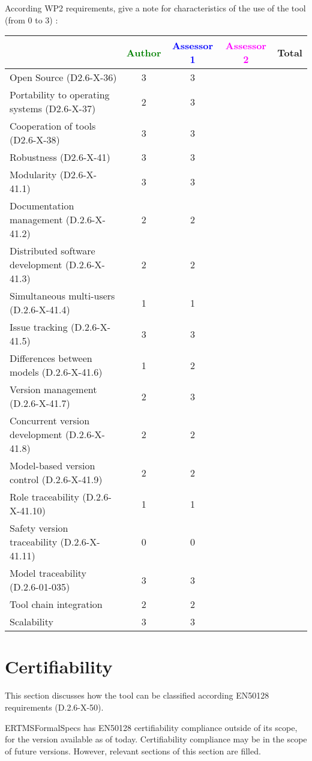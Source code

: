 According WP2 requirements, give a note for characteristics of the use of the tool (from 0 to 3) :

\begin{tabular}{|l | c | c | c | c|}
\hline
& \textcolor{green}{Author} & \textcolor{blue}{Assessor 1} & \textcolor{magenta}{Assessor 2} & Total \\
\hline 
Open Source (D2.6-X-36) & 3 & 3 & &  \\
\hline 
Portability to operating systems (D2.6-X-37) & 2 & 3 & &  \\
\hline
Cooperation of tools (D2.6-X-38) & 3 & 3 & &  \\
\hline
Robustness (D2.6-X-41) & 3 & 3 & & \\
\hline
Modularity (D2.6-X-41.1) & 3 & 3 & & \\
\hline
Documentation management (D.2.6-X-41.2) & 2 & 2 & & \\
\hline
Distributed software development (D.2.6-X-41.3)  & 2 & 2 & & \\
\hline
Simultaneous multi-users (D.2.6-X-41.4)   & 1 & 1 & & \\
\hline
Issue tracking (D.2.6-X-41.5) & 3 & 3 & & \\
\hline
Differences between models (D.2.6-X-41.6) & 1 & 2 & & \\
\hline
Version management (D.2.6-X-41.7) & 2 & 3 & & \\
\hline
Concurrent version development (D.2.6-X-41.8) & 2 & 2 & & \\
\hline
Model-based version control (D.2.6-X-41.9) & 2 & 2 & & \\
\hline
Role traceability (D.2.6-X-41.10) & 1 & 1 & & \\
\hline
Safety version traceability (D.2.6-X-41.11) & 0 & 0 & & \\
\hline
Model traceability (D.2.6-01-035) & 3 & 3 & & \\
\hline
Tool chain integration & 2 & 2 & & \\
\hline
Scalability & 3 & 3 & & \\
\hline
\end{tabular}

\section{Certifiability}

This section discusses how the tool can be classified according EN50128 requirements (D.2.6-X-50).

\begin{author_comment}
ERTMSFormalSpecs has EN50128 certifiability compliance outside of its scope, for the version available as of today. Certifiability compliance may be in the scope of future versions. However, relevant sections of this section are filled.
\end{author_comment}

